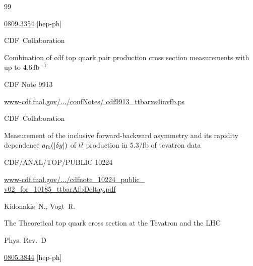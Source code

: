 \begin{thebibliography}{99}



\arxiv \href{http://arxiv.org/abs/0809.3354}{0809.3354} [hep-ph]







\by CDF~Collaboration

\preprint Combination of cdf top quark pair   production cross section measu\-re\-ments with up to $\rm 4.6\, fb^{-1}$


\preprintinfo CDF Note 9913


\elink \href{www-cdf.fnal.gov/physics/new/top/confNotes/cdf9913_ttbarxs4invfb.ps}{\scriptsize www-cdf.fnal.gov/.../confNotes/ cdf9913\_ttbarxs4invfb.ps}




\by CDF~Collaboration

\preprint Measurement of the inclusive   forward-backward asymmetry and its rapidity dependence $a_{\rm fb}(|\delta y|)$   of $t\bar{t}$ production in 5.3/fb of tevatron data


\preprintinfo CDF/ANAL/TOP/PUBLIC 10224


\elink \href{http://www-cdf.fnal.gov/physics/new/top/2010/tprop/Afb/cdfnote_10224_public_v02_for_10185_ttbarAfbDeltay.pdf}{\scriptsize www-cdf.fnal.gov/.../cdfnote\_10224\_public\_ v02\_for\_10185\_ttbarAfbDeltay.pdf}




\by Kidonakis~N., Vogt~R.

\paper The Theoretical top quark cross section at  the Tevatron and the LHC

\jour Phys. Rev.~D






\arxiv \href{http://arxiv.org/abs/0805.3844}{0805.3844} [hep-ph]


\end{thebibliography}
